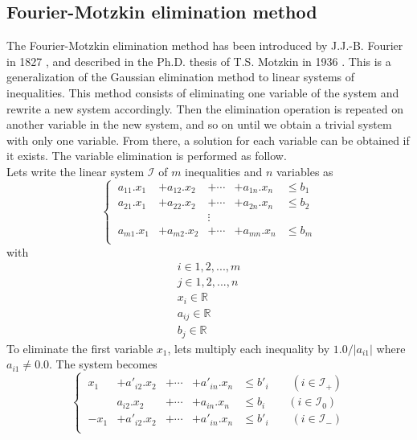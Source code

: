\documentclass[12pt, a4paper]{article}
\begin{document}
\subsection{Fourier-Motzkin elimination method}

The Fourier-Motzkin elimination method has been introduced by J.J.-B. Fourier in 1827 \cite{fourier}, and described in the Ph.D. thesis of T.S. Motzkin in 1936 \cite{motzkin}. This is a generalization of the Gaussian elimination method to linear systems of inequalities. This method consists of eliminating one variable of the system and rewrite a new system accordingly. Then the elimination operation is repeated on another variable in the new system, and so on until we obtain a trivial system with only one variable. From there, a solution for each variable can be obtained if it exists. The variable elimination is performed as follow.\\
Lets write the linear system $\mathcal{I}$ of $m$ inequalities and $n$ variables as 
\begin{equation}
\left\{\
\begin{array}{ccccc}
a_{11}.x_1&+a_{12}.x_2&+\cdots&+a_{1n}.x_n &\le b_1\\
a_{21}.x_1&+a_{22}.x_2&+\cdots&+a_{2n}.x_n &\le b_2\\
&&\vdots&&\\
a_{m1}.x_1&+a_{m2}.x_2&+\cdots&+a_{mn}.x_n &\le b_m\\
\end{array}
\right.
\end{equation}
with
\begin{equation}
\begin{array}{c}
i\in{1, 2, ..., m}\\
j\in{1, 2, ..., n}\\
x_i\in\mathbb{R}\\
a_{ij}\in\mathbb{R}\\
b_j\in\mathbb{R} 
\end{array}
\end{equation}
To eliminate the first variable $x_1$, lets multiply each inequality by $1.0/|a_{i1}|$ where $a_{i1}\not=0.0$. The system becomes
\begin{equation}
\left\{\
\begin{array}{ccccc}
x_1&+a'_{i2}.x_2&+\cdots&+a'_{in}.x_n &\le b'_i\qquad(i\in\mathcal{I}_+)\\
&a_{i2}.x_2&+\cdots&+a_{in}.x_n &\le b_i\qquad(i\in\mathcal{I}_0)\\
-x_1&+a'_{i2}.x_2&+\cdots&+a'_{in}.x_n &\le b'_i\qquad(i\in\mathcal{I}_-)\\
\end{array}
\right.
\end{equation}
\end{document}
